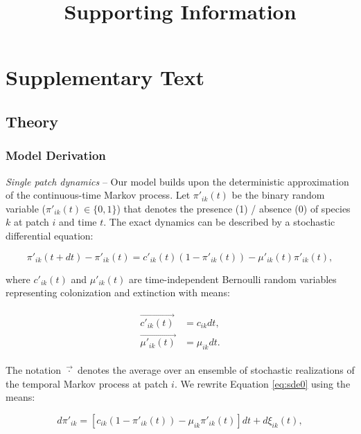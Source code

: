 \documentclass[11pt, class=article, crop=false]{standalone}
\title{Supporting Information}
\date{} %
\begin{document}
\maketitle

\tableofcontents

\newpage

\section{Supplementary Text}

\subsection{Theory}

\subsubsection{Model Derivation}

\textit{Single patch dynamics} --
Our model builds upon the deterministic approximation of the continuous-time Markov process.
Let $\pi'_{ik}(t)$ be the binary random variable ($\pi'_{ik}(t) \in \{0, 1\}$) that denotes the presence (1) / absence (0) of species $k$ at patch $i$ and time $t$.
The exact dynamics can be described by a stochastic differential equation:

\begin{equation}
    \pi'_{ik}(t + dt) - \pi'_{ik}(t) = c'_{ik}(t) (1 - \pi'_{ik}(t)) - \mu'_{ik}(t) \pi'_{ik}(t),
    \label{eq:sde0}
\end{equation}

where $c'_{ik}(t)$ and $\mu'_{ik}(t)$ are time-independent Bernoulli random variables representing colonization and extinction with means:

\begin{align}
    \begin{split}
        \overrightarrow{c'_{ik}(t)} &= c_{ik} dt,\\
        \overrightarrow{\mu'_{ik}(t)} &= \mu_{ik} dt.
    \end{split}
\end{align}

The notation $\overrightarrow{\cdot}$ denotes the average over an ensemble of stochastic realizations of the temporal Markov process at patch $i$.
We rewrite Equation \ref{eq:sde0} using the means:

\begin{equation}
    d \pi'_{ik} = [c_{ik} (1 - \pi'_{ik}(t)) - \mu_{ik} \pi'_{ik}(t)]dt + d\xi_{ik}(t),
    \label{eq:sde1}
\end{equation}
\end{document}
